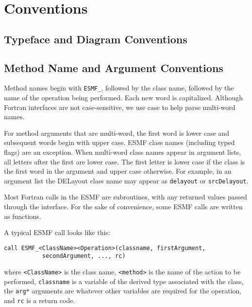 \section{Conventions}
\label{sec:conventions}

\subsection{Typeface and Diagram Conventions}



\subsection{Method Name and Argument Conventions}

Method names begin with {\tt ESMF\_}, followed by the class name, 
followed by the name of the operation being performed.  Each new 
word is capitalized.  Although Fortran interfaces are not case-sensitive,
we use case to help parse multi-word names.  

For method arguments that are multi-word, the first word is lower
case and subsequent words begin with upper case.  ESMF class 
names (including typed flags) are an exception.  When multi-word 
class names appear in argument lists, all letters after the first 
are lower case.  The first letter is lower case if the class is the
first word in the argument and upper case otherwise.  For 
example, in an argument list the DELayout class name may appear 
as {\tt delayout} or {\tt srcDelayout}.

Most Fortran calls in the ESMF are subroutines, with 
any returned values passed through the interface.  For the sake of 
convenience, some ESMF calls are written as functions.

A typical ESMF call looks like this:

\begin{verbatim}
call ESMF_<ClassName><Operation>(classname, firstArgument, 
           secondArgument, ..., rc)
\end{verbatim}

where \newline
{\tt <ClassName>} is the class name, \newline
{\tt <method>} is the name of the action to be performed, \newline 
{\tt classname} is a variable of the derived type associated 
with the class, \newline
the {\tt arg*} arguments are whatever other variables are required 
for the operation, \newline
and {\tt rc} is a return code. \newline

